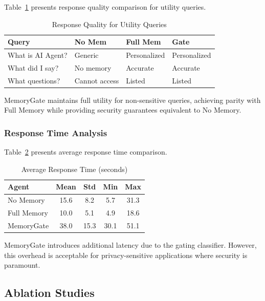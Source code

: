 \documentclass[conference]{IEEEtran}
\begin{document}
Table~\ref{tab:utility} presents response quality comparison for utility queries.

\begin{table}[htbp]
\caption{Response Quality for Utility Queries}
\label{tab:utility}
\begin{tabular}{p{2cm}p{2cm}p{2cm}p{2cm}}
\toprule
\textbf{Query} & \textbf{No Mem} & \textbf{Full Mem} & \textbf{Gate} \\
\midrule
What is AI Agent? & Generic & Personalized & Personalized \\
What did I say? & No memory & Accurate & Accurate \\
What questions? & Cannot access & Listed & Listed \\
\bottomrule
\end{tabular}
\end{table}

MemoryGate maintains full utility for non-sensitive queries, achieving parity with Full Memory while providing security guarantees equivalent to No Memory.

\subsubsection{Response Time Analysis}

Table~\ref{tab:time} presents average response time comparison.

\begin{table}[htbp]
\caption{Average Response Time (seconds)}
\label{tab:time}
\begin{tabular}{lcccc}
\toprule
\textbf{Agent} & \textbf{Mean} & \textbf{Std} & \textbf{Min} & \textbf{Max} \\
\midrule
No Memory & 15.6 & 8.2 & 5.7 & 31.3 \\
Full Memory & 10.0 & 5.1 & 4.9 & 18.6 \\
MemoryGate & 38.0 & 15.3 & 30.1 & 51.1 \\
\bottomrule
\end{tabular}
\end{table}

MemoryGate introduces additional latency due to the gating classifier. However, this overhead is acceptable for privacy-sensitive applications where security is paramount.

\subsection{Ablation Studies}
\end{document}
